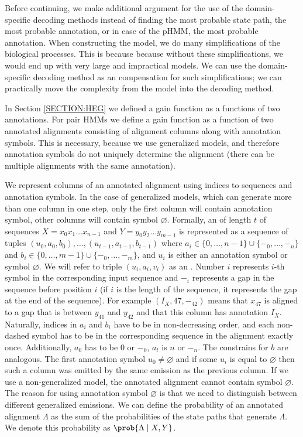 Before continuing, we make additional argument for the use of the
domain-specific decoding methods instead of finding the most probable state
path, the most probable annotation, or in case of the pHMM, the most probable
annotation. When constructing the model, we do many simplifications of the
biological processes. This is because because without these simplifications, we
would end up with very large and impractical models. We can use the
domain-specific decoding method as an compensation for such simplifications; we
can practically move the complexity from the model into the decoding method.

In Section \ref{SECTION:HEG} we defined a gain function as a functions of two
annotations. For pair HMMs we define a gain function as a function of two
annotated alignments consisting of alignment columns along with annotation
symbols. This is necessary, because we use generalized models, and therefore
annotation symbols do not uniquely determine the alignment (there can be
multiple alignments with the same annotation).

We represent columns of an annotated alignment using indices to sequences and
annotation symbols. In the case of generalized models, which can generate more
than one column in one step, only the first column will contain annotation
symbol, other columns will contain symbol $\varnothing$. Formally, an
 of length $t$ of sequences $X=x_0x_1\dots
x_{n-1}$ and $Y=y_0y_2\dots y_{m-1}$ is represented as a sequence of tuples
$(u_0, a_0, b_0), \dots, (u_{t-1}, a_{t-1}, b_{t-1})$ where $a_i\in \{0, \dots,
{n-1}\}\cup\{-_0, \dots, -_n\}$ and $b_i \in \{0, \dots, m-1\}\cup\{-_0, \dots,
-_m\}$, and $u_i$ is either an annotation symbol or symbol $\varnothing$. We
will refer to triple $(u_i, a_i, v_i)$ as an .  Number $i$ represents $i$-th symbol in the corresponding input
sequence and $-_i$ represents a gap in the sequence before position $i$ (if $i$
is the length of the sequence, it represents the gap at the end of the
sequence). For example $(I_X, 47, -_{42})$ means that $x_{47}$ is aligned to a
gap that is between $y_{41}$ and $y_{42}$ and that this column has annotation
$I_X$.  Naturally, indices in $a_i$ and $b_i$ have to be in non-decreasing
order, and each non-dashed symbol has to be in the corresponding sequence in
the alignment exactly once. Additionally, $a_0$ has to be $0$ or $-_{0}$, $a_t$
is $n$ or $-_n$. The constrains for $b$ are analogous.  The first annotation
symbol $u_0\not=\varnothing$ and if some $u_i$ is equal to $\varnothing$ then
such a column was emitted by the same emission as the previous column.  If we
use a non-generalized model, the annotated alignment cannot contain symbol
$\varnothing$. The reason for using annotation symbol $\varnothing$ is that we
need to distinguish between different generalized emissions.  We can define the
probability of an annotated alignment $\Lambda$ as the sum of the probabilities
of the state paths that generate $\Lambda$. We denote this probability as
$\prob{\Lambda\mid X, Y}$.

